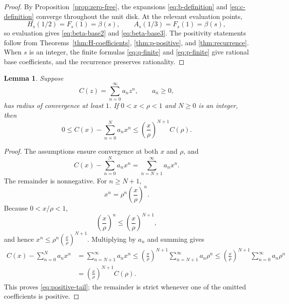 \documentclass[11pt,reqno]{amsart}
\numberwithin{equation}{section}
\newtheorem{lemma}[theorem]{Lemma}
\theoremstyle{definition}
\theoremstyle{remark}
\begin{document}
\begin{proof}
By Proposition~\ref{prop:zero-free}, the expansions
\eqref{eq:b-definition} and \eqref{eq:c-definition} converge
throughout the unit disk.  At the relevant evaluation points,
\[
 H_s(1/2)=F_s(1)=\beta(s),
\qquad
 A_s(1/3)=F_s(1)=\beta(s),
\]
so evaluation gives \eqref{eq:beta-base2} and
\eqref{eq:beta-base3}.  The positivity statements follow from
Theorems~\ref{thm:H-coefficients}, \ref{thm:p-positive}, and
\ref{thm:recurrence}.  When \(s\) is an integer, the finite formulas
\eqref{eq:q-finite} and \eqref{eq:p-finite} give rational base
coefficients, and the recurrence preserves rationality.
\end{proof}

\begin{lemma}\label{lem:tail}
Suppose
\[
C(z)=\sum_{n=0}^{\infty}a_nz^n,\qquad a_n\geq0,
\]
has radius of convergence at least \(1\).  If
\(0<x<\rho<1\) and \(N\geq0\) is an integer, then
\begin{equation}\label{eq:positive-tail}
 0\leq C(x)-\sum_{n=0}^{N}a_nx^n
 \leq
 \left(\frac{x}{\rho}\right)^{N+1}C(\rho).
\end{equation}
\end{lemma}
\begin{proof}
The assumptions ensure convergence at both \(x\) and \(\rho\), and
\[
 C(x)-\sum_{n=0}^{N}a_nx^n
 =
 \sum_{n=N+1}^{\infty}a_nx^n.
\]
The remainder is nonnegative.  For \(n\geq N+1\),
\[
 x^n
 =
 \rho^n\left(\frac{x}{\rho}\right)^n.
\]
Because \(0<x/\rho<1\),
\[
 \left(\frac{x}{\rho}\right)^n
 \leq
 \left(\frac{x}{\rho}\right)^{N+1},
\]
and hence
\(
 x^n
 \leq
 \rho^n\left(\frac{x}{\rho}\right)^{N+1}.
\)
Multiplying by \(a_n\) and summing gives
\[
 \begin{aligned}
 C(x)-\sum_{n=0}^{N}a_nx^n
 &=
 \sum_{n=N+1}^{\infty}a_nx^n\leq
 \left(\frac{x}{\rho}\right)^{N+1}
 \sum_{n=N+1}^{\infty}a_n\rho^n\leq
 \left(\frac{x}{\rho}\right)^{N+1}
 \sum_{n=0}^{\infty}a_n\rho^n\\
 &=
 \left(\frac{x}{\rho}\right)^{N+1}C(\rho).
 \end{aligned}
\]
This proves \eqref{eq:positive-tail}; the remainder is strict whenever
one of the omitted coefficients is positive.
\end{proof}
\end{document}
